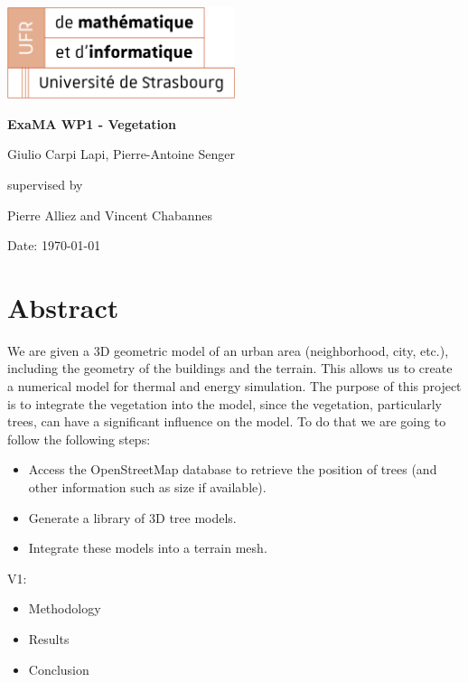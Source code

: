 \documentclass[12pt]{article}
\begin{document}
\begin{titlepage}
    \centering
    \includegraphics[width=0.5\textwidth]{images/logo_ufr.png}\par\vspace{1cm}
    \vspace{1.5cm}
    {\huge\bfseries ExaMA WP1 - Vegetation\par}
    \vspace{2cm}
    {\Large Giulio Carpi Lapi, Pierre-Antoine Senger\par}
    \vfill
    supervised by\par
    Pierre Alliez and Vincent Chabannes

    \vfill

    {\large Date: \today\par}
\end{titlepage}

\tableofcontents
\newpage

\section{Abstract}
We are given a 3D geometric model of an urban area (neighborhood, city, etc.),
including the geometry of the buildings and the terrain.
This allows us to create a numerical model for thermal and energy simulation.
The purpose of this project is to integrate the vegetation into the model,
since the vegetation, particularly trees,
can have a significant influence on the model.
To do that we are going to follow the following steps:

\begin{itemize}
    \item Access the OpenStreetMap database to retrieve the position of trees
    (and other information such as size if available).
    \item Generate a library of 3D tree models.
    \item Integrate these models into a terrain mesh.
\end{itemize}

V1:

\begin{itemize}
    \item Methodology
    \item Results
    \item Conclusion
\end{itemize}
\end{document}
